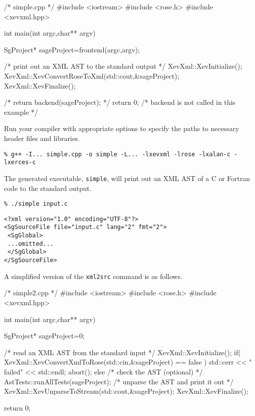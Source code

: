 \begin{framed}
\begin{src}
/* simple.cpp */
#include <iostream>
#include <rose.h>
#include <xevxml.hpp>

int main(int argc,char** argv){
  SgProject* sageProject=frontend(argc,argv);

  /* print out an XML AST to the standard output */
  XevXml::XevInitialize();
  XevXml::XevConvertRoseToXml(std::cout,&sageProject);
  XevXml::XevFinalize();

  /* return backend(sageProject); */
  return 0; /* backend is not called in this example */
}
\end{src}
\end{framed}

Run your compiler with appropriate options to specify the paths to
necessary header files and libraries.

\vspace{5mm}
\texttt{\% g++ -I... simple.cpp -o simple -L... -lxevxml -lrose -lxalan-c -lxerces-c }
\vspace{5mm}

\noindent The generated executable, \texttt{simple}, will print out an
XML AST of a C or Fortran code to the standard output.

\vspace{5mm}
\texttt{\% ./simple input.c}
\begin{verbatim}
<?xml version="1.0" encoding="UTF-8"?>
<SgSourceFile file="input.c" lang="2" fmt="2">
 <SgGlobal>
 ...omitted...
 </SgGlobal>
</SgSourceFile>
\end{verbatim}
\vspace{5mm}

A simplified version of the \texttt{xml2src} command is as follows.

\begin{framed}
\begin{src}
/* simple2.cpp */
#include <iostream>
#include <rose.h>
#include <xevxml.hpp>

int main(int argc,char** argv){
  SgProject* sageProject=0;

  /* read an XML AST from the standard input */
  XevXml::XevInitialize();
  if( XevXml::XevConvertXmlToRose(std::cin,&sageProject) == false ){
    std::cerr << " failed" << std::endl;
    abort();
  } 
  else {
    /* check the AST (optional) */
    AstTests::runAllTests(sageProject);
    /* unparse the AST and print it out */
    XevXml::XevUnparseToStream(std::cout,&sageProject);
  }
  XevXml::XevFinalize();

  return 0;
}
\end{src}
\end{framed}

